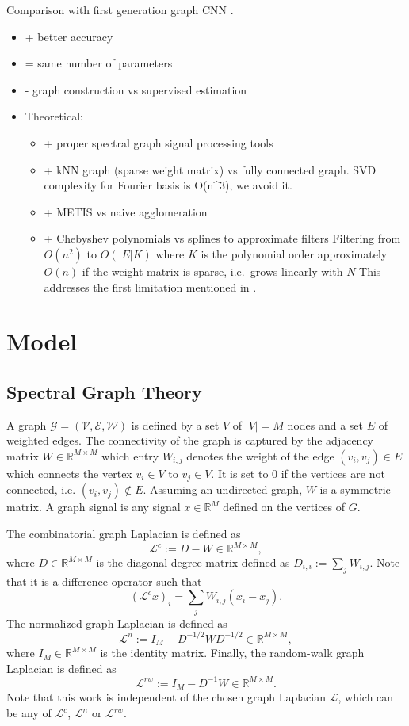 \documentclass{article}
\renewcommand{\L}{\mathcal{L}}
\newcommand{\G}{\mathcal{G}}
\newcommand{\V}{\mathcal{V}}
\newcommand{\E}{\mathcal{E}}
\newcommand{\W}{\mathcal{W}}
\newcommand{\R}{\mathbb{R}}
\begin{document}
Comparison with first generation graph CNN \citep{henaff_deep_2015}.

\begin{itemize}
\item
  + better accuracy
\item
  = same number of parameters
\item
  - graph construction vs supervised estimation
\item
  Theoretical:

  \begin{itemize}
  \item
    + proper spectral graph signal processing tools
  \item
    + kNN graph (sparse weight matrix) vs fully connected graph. SVD
    complexity for Fourier basis is O(n\^{}3), we avoid it.
  \item
    + METIS vs naive agglomeration
  \item
    + Chebyshev polynomials vs splines to approximate filters Filtering
    from \(O(n^2)\) to \(O(|E| K)\) where \(K\) is the polynomial order
    approximately \(O(n)\) if the weight matrix is sparse, i.e.~grows
    linearly with \(N\) This addresses the first limitation mentioned in
    \citep{henaff_deep_2015}.
  \end{itemize}
\end{itemize}

\section{Model}\label{model}

\subsection{Spectral Graph Theory}\label{spectral-graph-theory}

A graph \(\G = (\V, \E, \W)\) is defined by a set \(V\) of \(|V| = M\)
nodes and a set \(E\) of weighted edges. The connectivity of the graph
is captured by the adjacency matrix \(W \in \R^{M \times M}\) which
entry \(W_{i,j}\) denotes the weight of the edge \((v_i, v_j) \in E\)
which connects the vertex \(v_i \in V\) to \(v_j \in V\). It is set to
\(0\) if the vertices are not connected, i.e. \((v_i, v_j) \notin E\).
Assuming an undirected graph, \(W\) is a symmetric matrix. A graph
signal is any signal \(x \in \R^M\) defined on the vertices of \(G\).

The combinatorial graph Laplacian is defined as
\[ \L^c := D - W \in \R^{M \times M}, \] where \(D \in \R^{M \times M}\)
is the diagonal degree matrix defined as \(D_{i,i} := \sum_j W_{i,j}\).
Note that it is a difference operator such that
\[ (\L^c x)_i = \sum_j W_{i,j} (x_i - x_j). \] The normalized graph
Laplacian is defined as
\[ \L^n := I_M - D^{-1/2} W D^{-1/2} \in \R^{M \times M}, \] where
\(I_M \in \R^{M \times M}\) is the identity matrix. Finally, the
random-walk graph Laplacian is defined as
\[ \L^{rw} := I_M - D^{-1} W \in \R^{M \times M}. \] Note that this work
is independent of the chosen graph Laplacian \(\L\), which can be any of
\(\L^c\), \(\L^n\) or \(\L^{rw}\).
\end{document}
